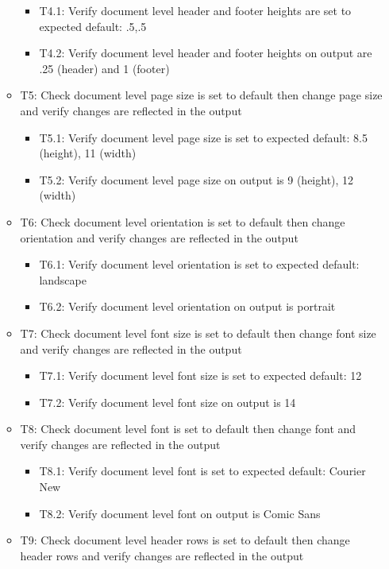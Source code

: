 \documentclass[]{article}
\providecommand{\tightlist}{%
  \setlength{\itemsep}{0pt}\setlength{\parskip}{0pt}}
\begin{document}
\begin{itemize}
\begin{itemize}
    \begin{itemize}
    \tightlist
    \item
      T4.1: Verify document level header and footer heights are set to
      expected default: .5,.5
    \item
      T4.2: Verify document level header and footer heights on output
      are .25 (header) and 1 (footer)
    \end{itemize}
  \item
    T5: Check document level page size is set to default then change
    page size and verify changes are reflected in the output

    \begin{itemize}
    \tightlist
    \item
      T5.1: Verify document level page size is set to expected default:
      8.5 (height), 11 (width)
    \item
      T5.2: Verify document level page size on output is 9 (height), 12
      (width)
    \end{itemize}
  \item
    T6: Check document level orientation is set to default then change
    orientation and verify changes are reflected in the output

    \begin{itemize}
    \tightlist
    \item
      T6.1: Verify document level orientation is set to expected
      default: landscape
    \item
      T6.2: Verify document level orientation on output is portrait
    \end{itemize}
  \item
    T7: Check document level font size is set to default then change
    font size and verify changes are reflected in the output

    \begin{itemize}
    \tightlist
    \item
      T7.1: Verify document level font size is set to expected default:
      12
    \item
      T7.2: Verify document level font size on output is 14
    \end{itemize}
  \item
    T8: Check document level font is set to default then change font and
    verify changes are reflected in the output

    \begin{itemize}
    \tightlist
    \item
      T8.1: Verify document level font is set to expected default:
      Courier New
    \item
      T8.2: Verify document level font on output is Comic Sans
    \end{itemize}
  \item
    T9: Check document level header rows is set to default then change
    header rows and verify changes are reflected in the output


\end{itemize}
\end{itemize}
\end{document}
